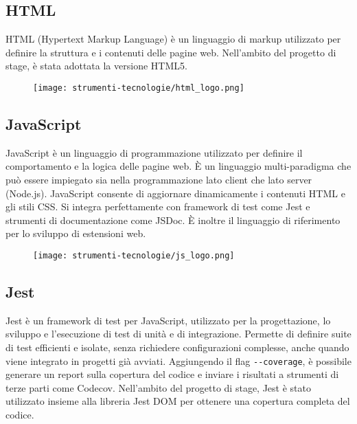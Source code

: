 \subsection*{HTML}

\par HTML (Hypertext Markup Language) è un linguaggio di markup utilizzato per definire la struttura e i contenuti delle pagine web. Nell’ambito del progetto di stage, è stata adottata la versione HTML5.

\begin{figure}[H]
    \centering 
    \texttt{[image: strumenti-tecnologie/html\_logo.png]} 
\end{figure}

\subsection*{JavaScript}

\par JavaScript è un linguaggio di programmazione utilizzato per definire il comportamento e la logica delle pagine web. È un linguaggio multi-paradigma che può essere impiegato sia nella programmazione lato client che lato server (Node.js). JavaScript consente di aggiornare dinamicamente i contenuti HTML e gli stili CSS. Si integra perfettamente con framework di test come Jest e strumenti di documentazione come JSDoc. È inoltre il linguaggio di riferimento per lo sviluppo di estensioni web.

\begin{figure}[H]
    \centering 
    \texttt{[image: strumenti-tecnologie/js\_logo.png]} 
\end{figure}

\subsection*{Jest}

\par Jest è un framework di test per JavaScript, utilizzato per la progettazione, lo sviluppo e l’esecuzione di test di unità e di integrazione. Permette di definire suite di test efficienti e isolate, senza richiedere configurazioni complesse, anche quando viene integrato in progetti già avviati. Aggiungendo il flag \verb|--coverage|, è possibile generare un report sulla copertura del codice e inviare i risultati a strumenti di terze parti come Codecov. Nell’ambito del progetto di stage, Jest è stato utilizzato insieme alla libreria Jest DOM per ottenere una copertura completa del codice.

